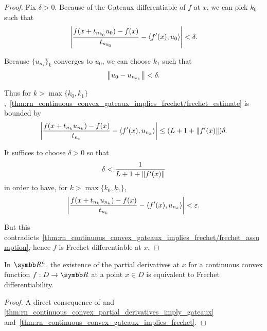 \begin{proof}
  Fix \( \delta > 0 \). Because of the Gateaux differentiable of \( f \) at \( x \), we can pick \( k_0 \) such that
  \begin{equation*}
    \left\vert \frac {f(x + t_{n_{k_0}} u_0) - f(x)} {t_{n_{k_0}}} - \left\langle f'(x), u_0 \right\rangle \right\vert < \delta.
  \end{equation*}

  Because \( \{ u_{n_k} \}_k \) converges to \( u_0 \), we can choose \( k_1 \) such that
  \begin{equation*}
    \left\Vert u_0 - u_{n_{k_1}} \right\Vert < \delta.
  \end{equation*}

  Thus for \( k > \max \{ k_0, k_1 \} \),~\cref{thm:rn_continuous_convex_gateaux_implies_frechet/frechet_estimate} is bounded by
  \begin{align*}
    \left\vert \frac {f(x + t_{n_k} u_{n_k}) - f(x)} {t_{n_k}} - \left\langle f'(x), u_{n_k} \right\rangle \right\vert
    \leq
    (L + 1 + \left\Vert f'(x) \right\Vert) \delta.
  \end{align*}

  It suffices to choose \( \delta > 0 \) so that
  \begin{equation*}
    \delta < \frac 1 {L + 1 + \left\Vert f'(x) \right\Vert}
  \end{equation*}
  in order to have, for \( k > \max \{ k_0, k_1 \} \),
  \begin{equation*}
    \left\vert \frac {f(x + t_{n_k} u_{n_k}) - f(x)} {t_{n_k}} - \left\langle f'(x), u_{n_k} \right\rangle \right\vert < \varepsilon.
  \end{equation*}

  But this contradicts~\cref{thm:rn_continuous_convex_gateaux_implies_frechet/frechet_assumption}, hence \( f \) is Frechet differentiable at \( x \).
\end{proof}

\begin{corollary}\label{thm:rn_continuous_convex_partial_derivatives_imply_frechet}
  In \( \BB{R}^n \), the existence of the partial derivatives at \( x \) for a continuous convex function \( f: D \to \BB{R} \) at a point \( x \in D \) is equivalent to Frechet differentiability.
\end{corollary}
\begin{proof}
  A direct consequence of and \cref{thm:rn_continuous_convex_partial_derivatives_imply_gateaux} and~\cref{thm:rn_continuous_convex_gateaux_implies_frechet}.
\end{proof}

